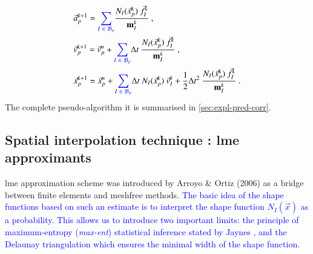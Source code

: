 \documentclass[preprint,12pt,a4paper]{elsarticle}
\newcommand{\tens}[1]{
  \ensuremath{\mathbf{{#1}}}
}
\begin{document}
\begin{align}
  \label{eq:Update-lagrangian-pce}
        &\vec{a}_p^{k+1} = \textcolor{blue}{\sum_{I\ \in\ \mathcal{B}_p}}
          \frac{N_{I}(\vec{x}_p^k)\ \vec{f}_{I}^{k}}{\tens{m}_I^k}\ ,\\
      &\vec{v}_p^{k+1} = \vec{v}_p^n + \textcolor{blue}{\sum_{I\ \in\ \mathcal{B}_p}} \Delta t\
        \frac{N_{I}(\vec{x}_p^k)\
        \vec{f}_{I}^{k}}{\tens{m}_I^k}\ ,\\
      &\vec{x}_p^{k+1} = \vec{x}_p^n +  \textcolor{blue}{\sum_{I\ \in\ \mathcal{B}_p}} \Delta t\
         N_{I}(\vec{x}_p^k)\ \vec{v}_{I}^{k} +
        \frac{1}{2}\Delta t^2\ \frac{N_{I}(\vec{x}_p^k)\
        \vec{f}_{I}^{k}}{\tens{m}_I^k}\ .
\end{align}
The complete pseudo-algorithm it is summarised in \ref{sec:expl-pred-corr}.

\subsection{Spatial interpolation technique : \acrlong{lme} approximants}
\label{sec:2.2}
\acrfull{lme} approximation scheme was introduced by Arroyo \& Ortiz
(2006)\cite{Arroyo2006} as a bridge between finite elements and
meshfree methods. \textcolor{blue}{The basic idea of the shape functions based on such an estimate is to interpret the shape function $N_I(\vec{x})$ as a probability. This allows us to introduce two important limits: the principle of maximum-entropy (\textit{max-ent}) statistical
inference stated by Jaynes \cite{Jaynes1957}, and the Delaunay triangulation
which ensures the minimal width of the shape function.}
\end{document}
